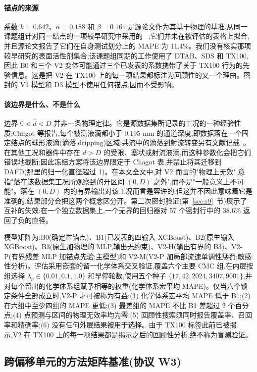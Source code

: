\documentclass[11pt,a4paper]{ctexart}
\begin{document}
\paragraph{锚点的来源} 系数 $k=0.642$、$\alpha=0.188$ 和 $\beta=0.161$,是源论文作为其基于物理的基准,从同一课题组针对同一结点的一项较早研究中采用的 ~\cite{kalli2022jcis,chagot2022};它们并未在被评估的表格上拟合,并且源论文报告了它们在自身测试划分上的 MAPE 为 11.4\%。我们没有核实那项较早研究的表面活性剂集合;该课题组同期的工作使用了 DTAB、SDS 和 TX100,因此 B0 和三个 V2 变体可能通过三个已发表的系数携带了关于 TX100 行为的先验信息。这是把 V2 在 TX100 上的每一项结果都标注为回顾性的又一个理由。密封的 V1 模型和 D3 模型不使用任何锚点,因而不受影响。

\paragraph{该边界是什么、不是什么} 边界 $0<\hat d<D$ 并非一条物理定律。它是源数据集所记录的工况的一种经验性质:Chagot 等报告,每个被测液滴都小于 0.195 mm 的通道深度,即数据落在一个固定结点的球形液滴(滴落,dripping)区域;共流中的滴落到射流转变另有文献记载~\cite{utada2007}。在其他工况和器件中存在 $d>D$ 的受限、塞状或射流液滴,而这种参数化会把它们错误地截断;因此冻结方案将该边界限定于 Chagot 表,并禁止将其迁移到 DAFD(那里的归一化直径超过 1)。在本文全文中,对 V2 而言的"物理上无效",意指"落在该数据集工况所观察到的开区间 $(0,D)$ 之外",而不是"一般意义上不可能"。落在 $(0,D)$ 内的有界输出对该工况而言是容许的;但这并不因此意味着它是准确的,结果部分会把这两个概念区分开。第二次密封验证(第~\ref{sec:r9}~节)展示了互补的失效:在一个独立数据集上,一个无界的回归器对 57 个密封行中的 38.6\% 返回了负的直径。

模型矩阵为:B0(确定性锚点)、B1(已发表的四输入 XGBoost)、B2(原生输入 XGBoost)、B3(原生加物理的 MLP,输出无约束)、V2-H(输出有界的 B3)、V2-P(有界残差 MLP 加锚点先验;主模型)和 V2-M(V2-P 加局部流速单调性惩罚;敏感性分析)。评估采用嵌套的留一化学体系交叉验证,覆盖六个主要 CMC 组,在内层按组选择 $\lambda_p\in\{0.01,0.1,1.0\}$ 和早停轮数,使用五个种子 $\{17,42,2024,3407,9001\}$,并对每个留出的化学体系组赋予相等的权重(化学体系宏平均 MAPE)。仅当六个锁定条件全部成立时,V2-P 才可被称为有益:(1) 化学体系宏平均 MAPE 低于 B1;(2) 在六组中至少四组的 MAPE 更低;(3) 最差组的 MAPE 不比 B1 差超过 2 个百分点;(4) 点预测与区间的物理无效率均为零;(5) 回顾性搜索须同时报告覆盖率、召回率和精确率;(6) 没有任何外层结果被用于选择。由于 TX100 标签此前已被揭示,V2 在 TX100 上的每一项结果都是揭示之后的回顾性分析,绝不称为盲测验证。

\subsection{跨偏移单元的方法矩阵基准(协议 W3)}
\label{sec:w3protocol}
\end{document}
